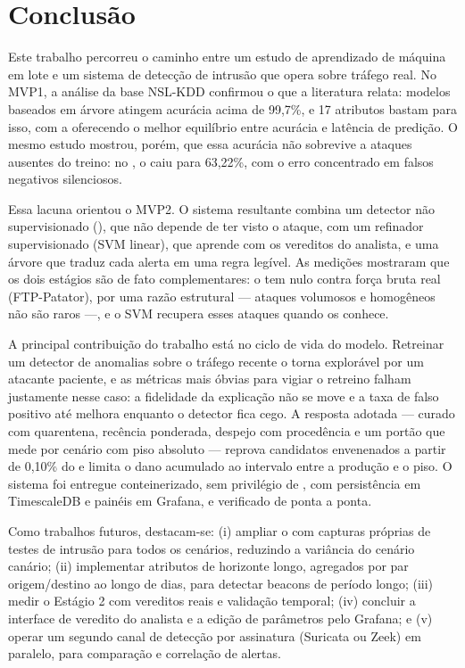 \section{Conclusão}

Este trabalho percorreu o caminho entre um estudo de aprendizado de máquina em lote
e um sistema de detecção de intrusão que opera sobre tráfego real. No MVP1, a
análise da base NSL-KDD confirmou o que a literatura relata: modelos baseados em
árvore atingem acurácia acima de 99,7\%, e 17 atributos bastam para isso, com a
 oferecendo o melhor equilíbrio entre acurácia e latência de
predição. O mesmo estudo mostrou, porém, que essa acurácia não sobrevive a ataques
ausentes do treino: no , o  caiu para 63,22\%, com o erro
concentrado em falsos negativos silenciosos.

Essa lacuna orientou o MVP2. O sistema resultante combina um detector não
supervisionado (), que não depende de ter visto o ataque, com
um refinador supervisionado (SVM linear), que aprende com os vereditos do
analista, e uma árvore  que traduz cada alerta em uma regra legível.
As medições mostraram que os dois estágios são de fato complementares: o
 tem  nulo contra força bruta real (FTP-Patator),
por uma razão estrutural --- ataques volumosos e homogêneos não são raros ---, e o
SVM recupera esses ataques quando os conhece.

A principal contribuição do trabalho está no ciclo de vida do modelo. Retreinar um
detector de anomalias sobre o tráfego recente o torna explorável por um atacante
paciente, e as métricas mais óbvias para vigiar o retreino falham justamente nesse
caso: a fidelidade da explicação não se move e a taxa de falso positivo até
melhora enquanto o detector fica cego. A resposta adotada ---  curado com
quarentena, recência ponderada, despejo com procedência e um portão que mede
 por cenário com piso absoluto --- reprova candidatos envenenados a
partir de 0,10\% do  e limita o dano acumulado ao intervalo entre a
produção e o piso. O sistema foi entregue conteinerizado, sem privilégio de
, com persistência em TimescaleDB e painéis em Grafana, e verificado de
ponta a ponta.

Como trabalhos futuros, destacam-se: (i) ampliar o  com capturas
próprias de testes de intrusão para todos os cenários, reduzindo a variância do
cenário canário; (ii) implementar atributos de horizonte longo, agregados por par
origem/destino ao longo de dias, para detectar beacons de período longo; (iii)
medir o Estágio 2 com vereditos reais e validação temporal; (iv) concluir a
interface de veredito do analista e a edição de parâmetros pelo Grafana; e (v)
operar um segundo canal de detecção por assinatura (Suricata ou Zeek) em paralelo,
para comparação e correlação de alertas.

